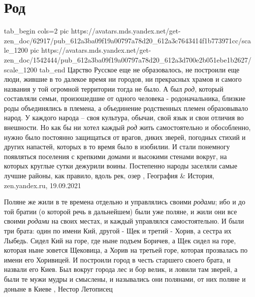  
 
 
 
 
\chapter{Род}
\label{sec:slova.rod}

\ifcmt
  tab_begin cols=2
     pic https://avatars.mds.yandex.net/get-zen_doc/62917/pub_612a3ba09f19a00797a78d20_612a3c7643414f1b773971cc/scale_1200
     pic https://avatars.mds.yandex.net/get-zen_doc/1542444/pub_612a3ba09f19a00797a78d20_612a3d700e2b051ebe1b2627/scale_1200
  tab_end
\fi
Царство Русское еще не образовалось, не построили еще люди, жившие в то далекое
время ни городов, ни прекрасных храмов и самого названия у той огромной
территории тогда не было.  А был \emph{род}, который составляли семьи,
произошедшие от одного человека - родоначальника, близкие роды объединялись в
племена, а объединение родственных племен образовывало народ. У каждого народа
– своя культура, обычаи, свой язык и свои отличия во внешности.  Но как бы ни
хотел каждый \emph{род} жить самостоятельно и обособленно, нужно было постоянно
защищаться от врагов, диких зверей, погодных стихий и других напастей, которых
в то время было в изобилии.  И стали понемногу появляться поселения с крепкими
домами и высокими стенами вокруг, на которых круглые сутки дежурили воины.
Постепенно народы заселяли самые лучшие районы, как правило, вдоль рек, озер
, 
География \& История, zen.yandex.ru, 19.09.2021

Поляне же жили в те времена отдельно и управлялись своими \emph{родами}; ибо и
до той братии (о которой речь в дальнейшем) были уже поляне, и жили они все
своими \emph{родами} на своих местах, и каждый управлялся самостоятельно. И
были три брата: один по имени Кий, другой - Щек и третий - Хорив, а сестра их
Лыбедь. Сидел Кий на горе, где ныне подъем Боричев, а Щек сидел на горе,
которая ныне зовется Щековица, а Хорив на третьей горе, которая прозвалась по
имени его Хоривицей. И построили город в честь старшего своего брата, и назвали
его Киев. Был вокруг города лес и бор велик, и ловили там зверей, а были те
мужи мудры и смыслены, и назывались они полянами, от них поляне и доныне в
Киеве
, Нестор Летописец
